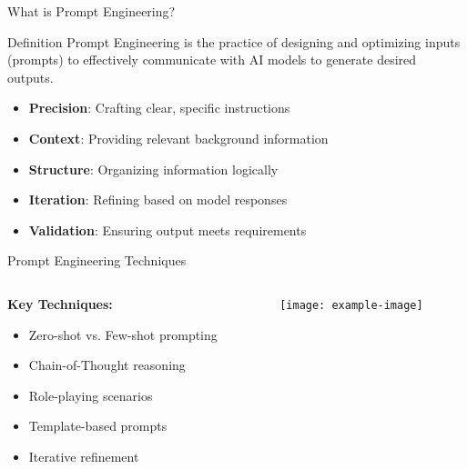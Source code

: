 \documentclass{beamer}
\begin{document}
\begin{frame}{What is Prompt Engineering?}
    \begin{block}{Definition}
        Prompt Engineering is the practice of designing and optimizing inputs (prompts) to effectively communicate with AI models to generate desired outputs.
    \end{block}
    
    \begin{itemize}
        \item \textbf{Precision}: Crafting clear, specific instructions
        \item \textbf{Context}: Providing relevant background information
        \item \textbf{Structure}: Organizing information logically
        \item \textbf{Iteration}: Refining based on model responses
        \item \textbf{Validation}: Ensuring output meets requirements
    \end{itemize}
\end{frame}

\begin{frame}{Prompt Engineering Techniques}
    \begin{columns}
        \begin{column}{0.6\textwidth}
            \textbf{Key Techniques:}
            \begin{itemize}
                \item Zero-shot vs. Few-shot prompting
                \item Chain-of-Thought reasoning
                \item Role-playing scenarios
                \item Template-based prompts
                \item Iterative refinement
            \end{itemize}
        \end{column}
        \begin{column}{0.4\textwidth}
            \centering
            \texttt{[image: example-image]} %
        \end{column}
    \end{columns}
\end{frame}
\end{document}
